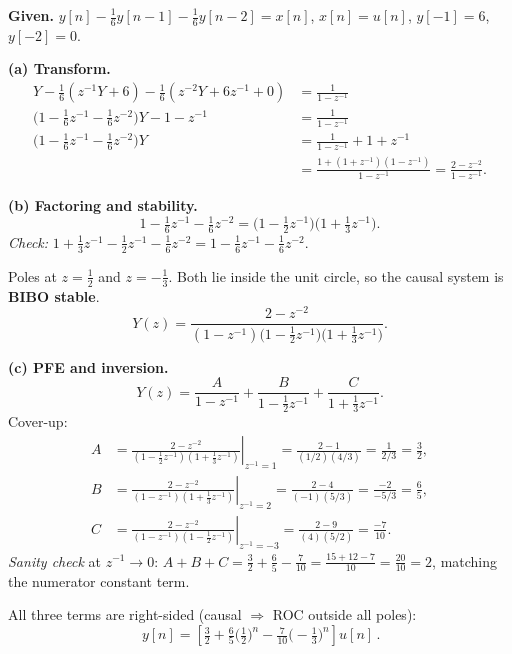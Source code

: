 \documentclass[11pt]{article}
\begin{document}
\textbf{Given.} $y[n] - \tfrac{1}{6}y[n-1] - \tfrac{1}{6}y[n-2] = x[n]$, $x[n]=u[n]$, $y[-1]=6$, $y[-2]=0$.

\textbf{(a) Transform.}
\begin{align*}
Y - \tfrac{1}{6}(z^{-1}Y + 6) - \tfrac{1}{6}(z^{-2}Y + 6z^{-1} + 0) &= \frac{1}{1-z^{-1}}\\
\bigl(1 - \tfrac{1}{6}z^{-1} - \tfrac{1}{6}z^{-2}\bigr)Y - 1 - z^{-1} &= \frac{1}{1-z^{-1}}\\
\bigl(1 - \tfrac{1}{6}z^{-1} - \tfrac{1}{6}z^{-2}\bigr)Y &= \frac{1}{1-z^{-1}} + 1 + z^{-1}\\
&= \frac{1 + (1+z^{-1})(1-z^{-1})}{1-z^{-1}} = \frac{2 - z^{-2}}{1-z^{-1}}.
\end{align*}

\textbf{(b) Factoring and stability.}
\[
1 - \tfrac{1}{6}z^{-1} - \tfrac{1}{6}z^{-2} = \bigl(1 - \tfrac{1}{2}z^{-1}\bigr)\bigl(1 + \tfrac{1}{3}z^{-1}\bigr).
\]
\textit{Check:} $1 + \tfrac{1}{3}z^{-1} - \tfrac{1}{2}z^{-1} - \tfrac{1}{6}z^{-2} = 1 - \tfrac{1}{6}z^{-1} - \tfrac{1}{6}z^{-2}.$ \checkmark

Poles at $z=\tfrac{1}{2}$ and $z=-\tfrac{1}{3}$. Both lie inside the unit circle, so the causal system is \textbf{BIBO stable}.
\[
Y(z) = \frac{2 - z^{-2}}{(1-z^{-1})\bigl(1-\tfrac{1}{2}z^{-1}\bigr)\bigl(1+\tfrac{1}{3}z^{-1}\bigr)}.
\]

\textbf{(c) PFE and inversion.}
\[
Y(z) = \frac{A}{1-z^{-1}} + \frac{B}{1-\tfrac{1}{2}z^{-1}} + \frac{C}{1+\tfrac{1}{3}z^{-1}}.
\]
Cover-up:
\begin{align*}
A &= \left.\frac{2-z^{-2}}{(1-\tfrac{1}{2}z^{-1})(1+\tfrac{1}{3}z^{-1})}\right|_{z^{-1}=1} = \frac{2-1}{(1/2)(4/3)} = \frac{1}{2/3} = \frac{3}{2},\\
B &= \left.\frac{2-z^{-2}}{(1-z^{-1})(1+\tfrac{1}{3}z^{-1})}\right|_{z^{-1}=2} = \frac{2-4}{(-1)(5/3)} = \frac{-2}{-5/3} = \frac{6}{5},\\
C &= \left.\frac{2-z^{-2}}{(1-z^{-1})(1-\tfrac{1}{2}z^{-1})}\right|_{z^{-1}=-3} = \frac{2-9}{(4)(5/2)} = \frac{-7}{10}.
\end{align*}
\textit{Sanity check} at $z^{-1}\to 0$: $A+B+C = \tfrac{3}{2} + \tfrac{6}{5} - \tfrac{7}{10} = \tfrac{15+12-7}{10} = \tfrac{20}{10} = 2$, matching the numerator constant term. \checkmark

All three terms are right-sided (causal $\Rightarrow$ ROC outside all poles):
\[
\boxed{\,y[n] = \left[\tfrac{3}{2} + \tfrac{6}{5}\bigl(\tfrac{1}{2}\bigr)^{n} - \tfrac{7}{10}\bigl(-\tfrac{1}{3}\bigr)^{n}\right]u[n]\,.}
\]
\end{document}
